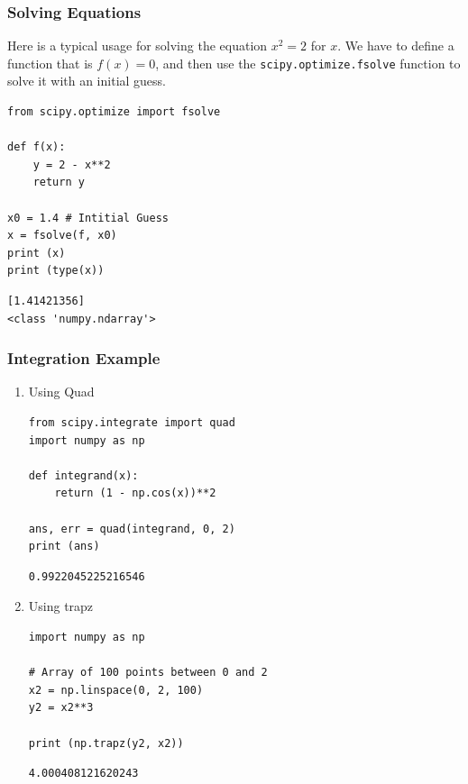 \documentclass[11pt]{article}
\begin{document}
\subsubsection{Solving Equations}
\label{sec:orgfbc4846}
Here is a typical usage for solving the equation \(x^2 = 2\) for \(x\). We have to define a function that is \(f(x) = 0\), and then use the \texttt{scipy.optimize.fsolve} function to solve it with an initial guess.

\begin{verbatim}
from scipy.optimize import fsolve

def f(x):
    y = 2 - x**2
    return y

x0 = 1.4 # Intitial Guess
x = fsolve(f, x0)
print (x)
print (type(x))
\end{verbatim}

\begin{verbatim}
[1.41421356]
<class 'numpy.ndarray'>
\end{verbatim}



\subsubsection{Integration Example}
\label{sec:org20eb886}

\begin{enumerate}
\item Using Quad
\label{sec:org67f6faf}
\begin{verbatim}
from scipy.integrate import quad
import numpy as np

def integrand(x):
    return (1 - np.cos(x))**2

ans, err = quad(integrand, 0, 2)
print (ans)
\end{verbatim}

\begin{verbatim}
0.9922045225216546
\end{verbatim}


\item Using trapz
\label{sec:org89fdd74}

\begin{verbatim}
import numpy as np

# Array of 100 points between 0 and 2
x2 = np.linspace(0, 2, 100)
y2 = x2**3

print (np.trapz(y2, x2))
\end{verbatim}

\begin{verbatim}
4.000408121620243
\end{verbatim}
\end{enumerate}
\end{document}
